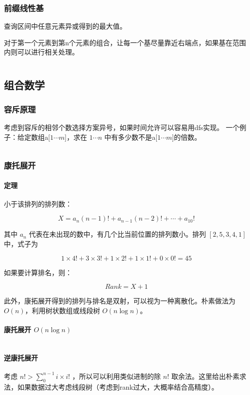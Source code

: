\documentclass[a4paper,11pt]{article}
\begin{document}
\subsubsection{前缀线性基}
查询区间中任意元素异或得到的最大值。

对于第一个元素到第n个元素的组合，让每一个基尽量靠近右端点，如果基在范围内则可以进行相关处理。
\inputminted[linenos]{c++}{math/prexianxingji.cpp}
\subsection{组合数学}
\subsubsection{容斥原理}
考虑到容斥的相邻个数选择方案异号，如果时间允许可以容易用dfs实现。
一个例子：给定数组a{[}\(1\cdots m\){]}，求在 \(1\cdots n\)
中有多少数不是a{[}\(1\cdots m\){]}的倍数。
\inputminted[linenos]{c++}{math/rongchi.cpp}
\subsubsection{康托展开}
\paragraph{定理}
小于该排列的排列数：

\[X=a_n(n-1)!+a_{n-1}(n-2)!+\cdots+a_10!\]

其中 \(a_n\) 代表在未出现的数中，有几个比当前位置的排列数小。排列
\([2,5,3,4,1]\) 中，式子为

\[1\times 4!+3\times3!+1\times 2!+1\times 1!+0\times 0!=45\]

如果要计算排名，则：

\[Rank=X+1\]

此外，康拓展开得到的排列与排名是双射，可以视为一种离散化。朴素做法为
\(O(n)\)，利用树状数组或线段树 \(O(n\log n)\)。
\paragraph{康托展开 \(O(n\log n)\)}
\inputminted[linenos]{c++}{math/cantor.cpp}
\paragraph{逆康托展开}
考虑 \(n! > \sum_0^{n-1}i\times i! \) ，所以可以利用类似进制的除 \(n!\) 取余法。这里给出朴素求法，如果数据过大考虑线段树（考虑到rank过大，大概率结合高精度）。
\inputminted[linenos]{c++}{math/invcantor.cpp}
\end{document}

